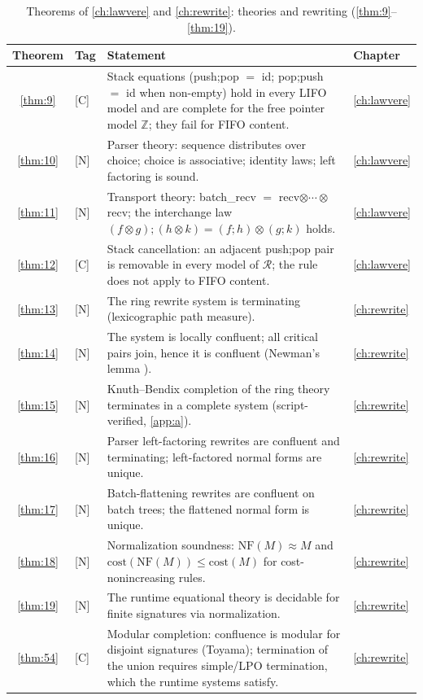 \begin{table}[!htbp]
\centering
\caption{Theorems of \autoref{ch:lawvere} and \autoref{ch:rewrite}: theories and rewriting (\autoref{thm:9}--\autoref{thm:19}).}
\label{tab:thm-lawvere-rewrite}
\small
\begin{tabular}{@{}clp{7.2cm}l@{}}
\toprule
Theorem & Tag & Statement & Chapter\\
\midrule
\ref{thm:9} & [C] & Stack equations (push;pop $=$ id; pop;push $=$ id when non-empty) hold in every LIFO model and are complete for the free pointer model $\mathbb{Z}$; they fail for FIFO content. & \autoref{ch:lawvere}\\
\ref{thm:10} & [N] & Parser theory: sequence distributes over choice; choice is associative; identity laws; left factoring is sound. & \autoref{ch:lawvere}\\
\ref{thm:11} & [N] & Transport theory: batch\_recv $=$ recv$\otimes\cdots\otimes$recv; the interchange law $(f\otimes g);(h\otimes k) = (f;h)\otimes (g;k)$ holds. & \autoref{ch:lawvere}\\
\ref{thm:12} & [C] & Stack cancellation: an adjacent push;pop pair is removable in every model of $\mathcal{R}$; the rule does not apply to FIFO content. & \autoref{ch:lawvere}\\
\ref{thm:13} & [N] & The ring rewrite system is terminating (lexicographic path measure). & \autoref{ch:rewrite}\\
\ref{thm:14} & [N] & The system is locally confluent; all critical pairs join, hence it is confluent (Newman's lemma \cite{newman}). & \autoref{ch:rewrite}\\
\ref{thm:15} & [N] & Knuth--Bendix completion of the ring theory terminates in a complete system (script-verified, \autoref{app:a}). & \autoref{ch:rewrite}\\
\ref{thm:16} & [N] & Parser left-factoring rewrites are confluent and terminating; left-factored normal forms are unique. & \autoref{ch:rewrite}\\
\ref{thm:17} & [N] & Batch-flattening rewrites are confluent on batch trees; the flattened normal form is unique. & \autoref{ch:rewrite}\\
\ref{thm:18} & [N] & Normalization soundness: $\mathrm{NF} (M) \approx M$ and $\mathrm{cost} (\mathrm{NF} (M)) \le \mathrm{cost} (M)$ for cost-nonincreasing rules. & \autoref{ch:rewrite}\\
\ref{thm:19} & [N] & The runtime equational theory is decidable for finite signatures via normalization. & \autoref{ch:rewrite}\\
\ref{thm:54} & [C] & Modular completion: confluence is modular for disjoint signatures (Toyama); termination of the union requires simple/LPO termination, which the runtime systems satisfy. & \autoref{ch:rewrite}\\
\bottomrule
\end{tabular}
\end{table}


